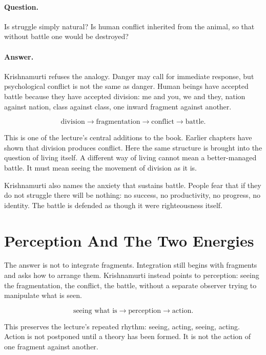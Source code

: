 \documentclass[11pt,oneside]{book}
\begin{document}
\paragraph{Question.}
Is struggle simply natural? Is human conflict inherited from the animal, so that without battle one would be destroyed?

\paragraph{Answer.}
Krishnamurti refuses the analogy. Danger may call for immediate response, but psychological conflict is not the same as danger. Human beings have accepted battle because they have accepted division: me and you, we and they, nation against nation, class against class, one inward fragment against another.

\begin{equation}
\text{division}
\longrightarrow
\text{fragmentation}
\longrightarrow
\text{conflict}
\longrightarrow
\text{battle}.
\end{equation}

This is one of the lecture's central additions to the book. Earlier chapters have shown that division produces conflict. Here the same structure is brought into the question of living itself. A different way of living cannot mean a better-managed battle. It must mean seeing the movement of division as it is.

Krishnamurti also names the anxiety that sustains battle. People fear that if they do not struggle there will be nothing: no success, no productivity, no progress, no identity. The battle is defended as though it were righteousness itself.

\section{Perception And The Two Energies}

The answer is not to integrate fragments. Integration still begins with fragments and asks how to arrange them. Krishnamurti instead points to perception: seeing the fragmentation, the conflict, the battle, without a separate observer trying to manipulate what is seen.

\begin{equation}
\text{seeing what is}
\longrightarrow
\text{perception}
\longrightarrow
\text{action}.
\end{equation}

This preserves the lecture's repeated rhythm: seeing, acting, seeing, acting. Action is not postponed until a theory has been formed. It is not the action of one fragment against another.
\end{document}
